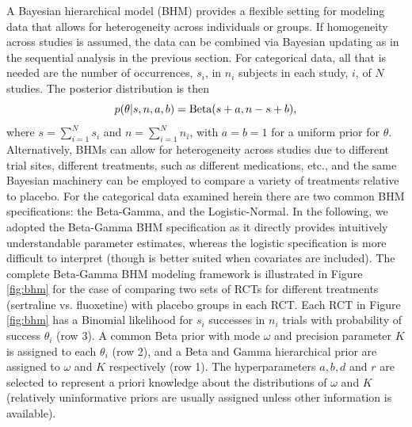 \documentclass{juliacon}
\begin{document}
A Bayesian hierarchical model (BHM) provides a flexible setting for modeling data that allows for heterogeneity across individuals or groups. If homogeneity across studies is assumed, the data can be combined via Bayesian updating as in the sequential analysis in the previous section.  For categorical data, all that is needed are the number of occurrences, $s_i$, in $n_i$ subjects in each study, $i$, of $N$ studies. The posterior distribution is then 
\begin{equation}
p(\theta | s, n,a,b) = \\ \textnormal{Beta}( s + a, n - s + b),
\label{eq:pbeta}
\end{equation}
where $s = \sum_{i=1}^N s_i$ and $n = \sum_{i=1}^N n_i$, with $a=b=1$ for a uniform prior for $\theta$.
\vskip 6pt
Alternatively, BHMs can allow for heterogeneity across studies due to different trial sites, different treatments, such as different medications, etc., and the same Bayesian machinery can be employed to compare a variety of treatments relative to placebo. For the categorical data examined herein there are two common BHM specifications: the Beta-Gamma\cite{Kruschke2014}, and the Logistic-Normal\cite{Mcelreath2015}.  In the following, we adopted the Beta-Gamma BHM specification as it directly provides intuitively understandable parameter estimates, whereas the logistic specification is more difficult to interpret (though is better suited when covariates are included).
\vskip 6pt
The complete Beta-Gamma BHM modeling framework is illustrated in Figure \ref{fig:bhm} for the case of comparing two sets of RCTs for different treatments (sertraline vs. fluoxetine) with placebo groups in each RCT. Each RCT in Figure \ref{fig:bhm} has a Binomial likelihood for $s_i$ successes in $n_i$ trials with probability of success $\theta_i$ (row 3).  A common Beta prior with mode $\omega$ and precision parameter $K$ is assigned to each $\theta_i$ (row 2), and a Beta and Gamma hierarchical prior are assigned to $\omega$ and $K$ respectively (row 1). The hyperparameters $a,b,d$ and $r$ are selected to represent a priori knowledge about the distributions of $\omega$ and $K$ (relatively uninformative priors are usually assigned unless other information is available).
\end{document}
